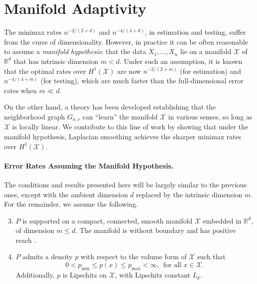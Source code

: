 \documentclass[twoside]{article}
\newcommand{\Reals}{\mathbb{R}}
\newcommand{\1}{\mathbf{1}}
\newcommand{\Rd}{\Reals^d}
\newcommand{\Xset}{\mathcal{X}}
\theoremstyle{definition}
\theoremstyle{remark}
\begin{document}
\section{Manifold Adaptivity}
\label{sec:manifold_adaptivity}

The minimax rates $n^{-2/(2 + d)}$ and $n^{-4/(4 + d)}$, in estimation and testing, suffer from the curse of dimensionality. However, in practice it can be often reasonable to assume a \emph{manifold hypothesis}: that the data $X_1,\ldots,X_n$ lie on a manifold $\Xset$ of $\Rd$ that has intrinsic dimension $m < d$. Under such an assumption, it is known \citep{bickel2007,ariascastro2018} that the optimal rates over $H^1(\Xset)$ are now $n^{-2/(2 + m)}$ (for estimation) and $n^{-4/(4 + m)}$ (for testing), which are much faster than the full-dimensional error rates when $m \ll d$. 


On the other hand, a theory has been developed \citep{belkin03,belkin05,niyogi2013} establishing that the neighborhood graph $G_{n,r}$ can ``learn'' the manifold $\Xset$ in various senses, so long as $\Xset$ is locally linear. We contribute to this line of work by showing that under the manifold hypothesis, Laplacian smoothing achieves the sharper minimax rates over $H^1(\Xset)$.

\paragraph{Error Rates Assuming the Manifold Hypothesis.}

The conditions and results presented here will be largely similar to the previous ones, except with the ambient dimension $d$ replaced by the intrinsic dimension $m$. For the remainder, we assume the following.
\begin{enumerate}[label=(P\arabic*)]
	\setcounter{enumi}{2}
	\item 
	\label{asmp:domain_manifold}
	$P$ is supported on a compact, connected, smooth manifold $\Xset$ embedded in $\Rd$, of dimension $m \leq d$. The manifold is without boundary and has positive reach \citep{federer1959}.
	\item 
	\label{asmp:density_manifold} 
	$P$ admits a density $p$ with respect to the volume form of $\Xset$ such that 
	\begin{equation*}
	0 < p_{\min} \leq p(x) \leq p_{\max} < \infty, ~~\textrm{for all $x \in \Xset$}. 
	\end{equation*}
	Additionally, $p$ is Lipschitz on $\Xset$, with Lipschitz constant $L_p$.
\end{enumerate}
\end{document}
